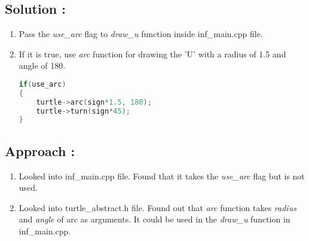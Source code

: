 \documentclass[12pt]{article}
\begin{document}

\subsection{Solution :}
\begin{enumerate}
\item Pass the \textit{use\_arc} flag to \textit{draw\_u} function inside inf\_main.cpp file.
\item If it is true, use \textit{arc} function for drawing the 'U' with a radius of 1.5 and angle of 180.
\begin{lstlisting}[language=c++]
if(use_arc)
{
    turtle->arc(sign*1.5, 180);
    turtle->turn(sign*45);
}
\end{lstlisting}
\end{enumerate}

\subsection{Approach :}
\begin{enumerate}
\item Looked into inf\_main.cpp file. Found that it takes the \textit{use\_arc} flag but is not used.
\item Looked into turtle\_abstract.h file. Found out that \textit{arc} function takes \textit{radius} and \textit{angle} of arc as arguments. It could be used in the \textit{draw\_u} function in inf\_main.cpp.
\end{enumerate}
\end{document}

